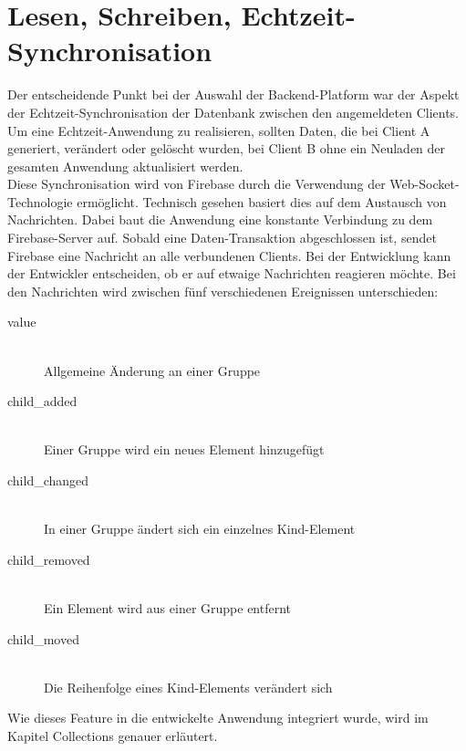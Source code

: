 \section{Lesen, Schreiben, Echtzeit-Synchronisation}
Der entscheidende Punkt bei der Auswahl der Backend-Platform war der Aspekt der Echtzeit-Synchronisation der Datenbank zwischen den angemeldeten Clients.
Um eine Echtzeit-Anwendung zu realisieren, sollten Daten, die bei Client A generiert, verändert oder gelöscht wurden, bei Client B ohne ein Neuladen der gesamten Anwendung aktualisiert werden.\\
Diese Synchronisation wird von Firebase durch die Verwendung der Web-Socket-Technologie ermöglicht. Technisch gesehen basiert dies auf dem Austausch von Nachrichten. Dabei baut die Anwendung eine konstante Verbindung
zu dem Firebase-Server auf. Sobald eine Daten-Transaktion abgeschlossen ist, sendet Firebase eine Nachricht an alle verbundenen Clients. Bei der Entwicklung kann der Entwickler entscheiden, ob er auf etwaige Nachrichten reagieren möchte.
Bei den Nachrichten wird zwischen fünf verschiedenen Ereignissen unterschieden:

\begin{description}
\item[value]\hfill \\
Allgemeine Änderung an einer Gruppe
\item[child\_added]\hfill \\ 
Einer Gruppe wird ein neues Element hinzugefügt
\item[child\_changed]\hfill \\ 
In einer Gruppe ändert sich ein einzelnes Kind-Element
\item[child\_removed]\hfill \\ 
Ein Element wird aus einer Gruppe entfernt
\item[child\_moved]\hfill \\ 
Die Reihenfolge eines Kind-Elements verändert sich
\end{description}


Wie dieses Feature in die entwickelte Anwendung integriert wurde, wird im Kapitel Collections genauer erläutert.

